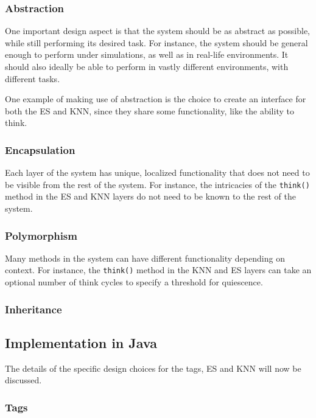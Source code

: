 \documentclass[titlepage,11pt]{article}
\newcommand{\code}[1]{\texttt{#1}}
\begin{document}
\subsubsection{Abstraction}

One important design aspect is that the system should be as abstract as possible, while still performing its desired task. For instance, the system should be general enough to perform under simulations, as well as in real-life environments. It should also ideally be able to perform in vastly different environments, with different tasks.

One example of making use of abstraction is the choice to create an interface for both the ES and KNN, since they share some functionality, like the ability to think.

\subsubsection{Encapsulation}

Each layer of the system has unique, localized functionality that does not need to be visible from the rest of the system. For instance, the intricacies of the \code{think()} method in the ES and KNN layers do not need to be known to the rest of the system.

\subsubsection{Polymorphism}

Many methods in the system can have different functionality depending on context. For instance, the \code{think()} method in the KNN and ES layers can take an optional number of think cycles to specify a threshold for quiescence.

\subsubsection{Inheritance}

\subsection{Implementation in Java}

The details of the specific design choices for the tags, ES and KNN will now be discussed.

\subsubsection{Tags}
\end{document}
